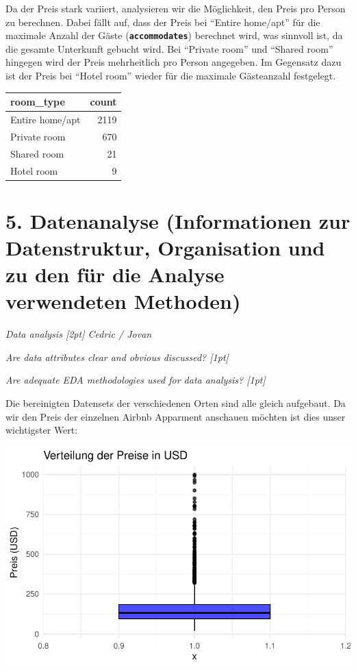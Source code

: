 \documentclass[
  journal,
]{IEEEtran}%
\begin{document}
Da der Preis stark variiert, analysieren wir die Möglichkeit, den Preis
pro Person zu berechnen. Dabei fällt auf, dass der Preis bei ``Entire
home/apt'' für die maximale Anzahl der Gäste
(\textbf{\texttt{accommodates}}) berechnet wird, was sinnvoll ist, da
die gesamte Unterkunft gebucht wird. Bei ``Private room'' und ``Shared
room'' hingegen wird der Preis mehrheitlich pro Person angegeben. Im
Gegensatz dazu ist der Preis bei ``Hotel room'' wieder für die maximale
Gästeanzahl festgelegt.

\begin{longtable}[]{@{}lr@{}}
\toprule\noalign{}
room\_type & count \\
\midrule\noalign{}
\endhead
\bottomrule\noalign{}
\endlastfoot
Entire home/apt & 2119 \\
Private room & 670 \\
Shared room & 21 \\
Hotel room & 9 \\
\end{longtable}

\hypertarget{datenanalyse-informationen-zur-datenstruktur-organisation-und-zu-den-fuxfcr-die-analyse-verwendeten-methoden}{%
\section{5. Datenanalyse (Informationen zur Datenstruktur, Organisation
und zu den für die Analyse verwendeten
Methoden)}\label{datenanalyse-informationen-zur-datenstruktur-organisation-und-zu-den-fuxfcr-die-analyse-verwendeten-methoden}}

\emph{Data analysis {[}2pt{]} Cedric / Jovan}

\emph{Are data attributes clear and obvious discussed? {[}1pt{]}}

\emph{Are adequate EDA methodologies used for data analysis? {[}1pt{]}}

Die bereinigten Datensets der verschiedenen Orten sind alle gleich
aufgebaut. Da wir den Preis der einzelnen Airbnb Apparment anschauen
möchten ist dies unser wichtigster Wert:

\includegraphics{main_files/figure-pdf/unnamed-chunk-6-1.pdf}
\end{document}
